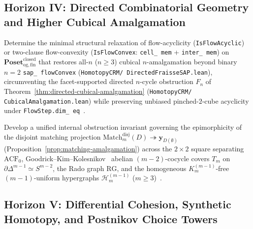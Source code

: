 \subsection*{Horizon IV: Directed Combinatorial Geometry and Higher Cubical Amalgamation}

\begin{problem}\label{prob:open-7}
Determine the minimal structural relaxation of flow-acyclicity (\texttt{IsFlowAcyclic}) or two-clause flow-convexity (\texttt{IsFlowConvex}: \texttt{cell\_ mem} + \texttt{inter\_ mem}) on $\mathbf{Poset}_{\mathrm{og,fin}}^{\mathrm{closed}}$ that restores all-$n$ ($n \ge 3$) cubical $n$-amalgamation beyond binary $n = 2$ \texttt{sap\_ flowConvex} (\texttt{HomotopyCRM/ DirectedFraisseSAP.lean}), circumventing the facet-supported directed $n$-cycle obstruction $F_n$ of Theorem~\ref{thm:directed-cubical-amalgamation} (\texttt{HomotopyCRM/ CubicalAmalgamation.lean}) while preserving unbiased pinched-$2$-cube acyclicity under \texttt{FlowStep.dim\_ eq}~\cite{Masuda26}.
\end{problem}

\begin{problem}\label{prob:open-8}
Develop a unified internal obstruction invariant governing the epimorphicity of the disjoint matching projection $\mathrm{Match}_m^{\mathrm{disj}}(D) \twoheadrightarrow \mathbf{y}_{D(\emptyset)}$ (Proposition~\ref{prop:matching-amalgamation}) across the $2 \times 2$ square separating $\mathrm{ACF}_0$, Goodrick--Kim--Kolesnikov~\cite{GKK14} abelian $(m-2)$-cocycle covers $T_m$ on $\partial\Delta^{m-1} \simeq S^{m-2}$, the Rado graph $\mathrm{RG}$, and the homogeneous $K_m^{(m-1)}$-free $(m-1)$-uniform hypergraphs $\mathcal{H}_m^{(m-1)}$ ($m \ge 3$)~\cite{Kihara26}.
\end{problem}

\subsection*{Horizon V: Differential Cohesion, Synthetic Homotopy, and Postnikov Choice Towers}

